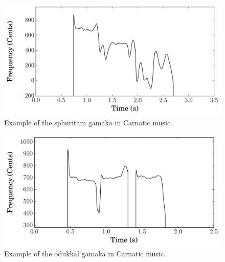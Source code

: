 \begin{figure}[h]
	\begin{center}
		\includegraphics[width=\figSizeEighty]{ch02_background/figures/Sphuritam_on_M1_Raga_Arabhi.pdf}
	\end{center}\vspace{-1em}
	\caption[An example of the \gls{sphuritam} \gls{gamaka} in Carnatic music]{Example of the \gls{sphuritam} \gls{gamaka} in Carnatic music.}
	\label{fig:sphuritam_todi}
\end{figure}

\begin{figure}[h]
	\begin{center}
		\includegraphics[width=\figSizeEighty]{ch02_background/figures/Odukkal_on_D1.pdf}
	\end{center}\vspace{-1em}
	\caption[An example of the \gls{odukkal} \gls{gamaka} in Carnatic music]{Example of the \gls{odukkal} \gls{gamaka} in Carnatic music.}
	\label{fig:odukkal_todi}
\end{figure}


